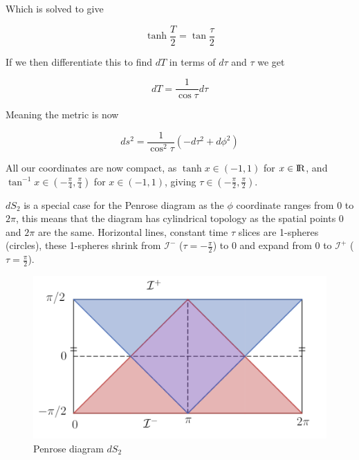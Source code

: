 \documentclass[a4paper,11pt]{article}
\numberwithin{equation}{section}
\numberwithin{figure}{section}
\begin{document}
\begin{large}
Which is solved to give

\begin{equation}
\label{T_tau_rel}
    \tanh \frac{T}{2}=\tan \frac{\tau}{2}
\end{equation}


If we then differentiate this to find $dT$ in terms of $d\tau$ and $\tau$ we get

\begin{equation}
\label{dT_dtau_rel}
    dT=\frac{1}{\cos\tau}d\tau
\end{equation}

Meaning the metric is now 

\begin{equation}
\label{compact_global_metric}
    ds^2=\frac{1}{\cos^2\tau}(-d\tau^2+d\phi^2)
\end{equation}

All our coordinates are now compact, as $\tanh x \in (-1,1)$ for $x \in {\rm I\!R}$, and $\tan^{-1} x \in (-\frac{\pi}{4},\frac{\pi}{4})$ for $x \in (-1,1)$, giving $\tau \in (-\frac{\pi}{2},\frac{\pi}{2})$.

$dS_2$ is a special case for the Penrose diagram as the $\phi$ coordinate ranges from $0$ to $2\pi$, this means that the diagram has cylindrical topology as the spatial points $0$ and $2\pi$ are the same. Horizontal lines, constant time $\tau$ slices are 1-spheres (circles), these 1-spheres shrink from $\mathcal{I}^-$ ($\tau=-\frac{\pi}{2}$) to $0$ and expand from $0$ to $\mathcal{I}^+$ ($\tau=\frac{\pi}{2}$).

\newpage


\begin{figure}[h]
    \centering
    \includegraphics[width=12cm]{Penrose_dS2.PNG}
    \caption{Penrose diagram $dS_2$}
    \label{fig:penrose_dS2}
    
\end{figure}



\end{large}
\end{document}
